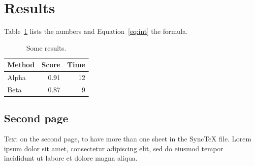 \section{Results}
Table~\ref{tab:r} lists the numbers and Equation~\eqref{eq:int} the formula.

\begin{table}[h]
  \centering
  \begin{tabular}{lrr}
    Method & Score & Time \\
    \hline
    Alpha & 0.91 & 12 \\
    Beta  & 0.87 & 9 \\
  \end{tabular}
  \caption{Some results.}
  \label{tab:r}
\end{table}

\newpage
\subsection{Second page}
Text on the second page, to have more than one sheet in the SyncTeX
file. Lorem ipsum dolor sit amet, consectetur adipiscing elit, sed do
eiusmod tempor incididunt ut labore et dolore magna aliqua.
